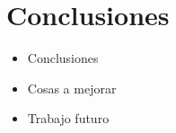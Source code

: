 \section{Conclusiones}
\label{s4:sec:Conclusiones}

\begin{itemize}
\item Conclusiones
\item Cosas a mejorar
\item Trabajo futuro
\end{itemize}







%
%


